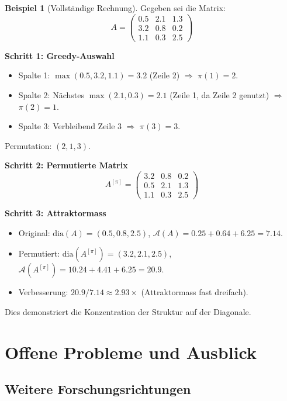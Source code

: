 \documentclass[a4paper,12pt]{article}
\theoremstyle{definition}
\newtheorem{beispiel}{Beispiel}
\begin{document}
\begin{beispiel}[Vollständige Rechnung]
	Gegeben sei die Matrix:
	\[
	A = \begin{pmatrix}
		0.5 & 2.1 & 1.3 \\
		3.2 & 0.8 & 0.2 \\
		1.1 & 0.3 & 2.5
	\end{pmatrix}
	\]
	
	\textbf{Schritt 1: Greedy-Auswahl}
	\begin{itemize}
		\item Spalte 1: $\max(0.5, 3.2, 1.1) = 3.2$ (Zeile 2) $\Rightarrow$ $\pi(1) = 2$.
		\item Spalte 2: Nächstes $\max(2.1, 0.3) = 2.1$ (Zeile 1, da Zeile 2 genutzt) $\Rightarrow$ $\pi(2) = 1$.
		\item Spalte 3: Verbleibend Zeile 3 $\Rightarrow$ $\pi(3) = 3$.
	\end{itemize}
	
	Permutation: $(2, 1, 3)$.
	
	\textbf{Schritt 2: Permutierte Matrix}
	\[
	A^{[\pi]} = \begin{pmatrix}
		3.2 & 0.8 & 0.2 \\
		0.5 & 2.1 & 1.3 \\
		1.1 & 0.3 & 2.5
	\end{pmatrix}
	\]
	
	\textbf{Schritt 3: Attraktormass}
	\begin{itemize}
		\item Original: $\text{dia}(A) = (0.5, 0.8, 2.5)$, $\mathcal{A}(A) = 0.25 + 0.64 + 6.25 = 7.14$.
		\item Permutiert: $\text{dia}(A^{[\pi]}) = (3.2, 2.1, 2.5)$, $\mathcal{A}(A^{[\pi]}) = 10.24 + 4.41 + 6.25 = 20.9$.
		\item Verbesserung: $20.9 / 7.14 \approx 2.93 \times$ (Attraktormass fast dreifach).
	\end{itemize}
	
	Dies demonstriert die Konzentration der Struktur auf der Diagonale.
\end{beispiel}

\section{Offene Probleme und Ausblick}

\subsection{Weitere Forschungsrichtungen}
\end{document}
